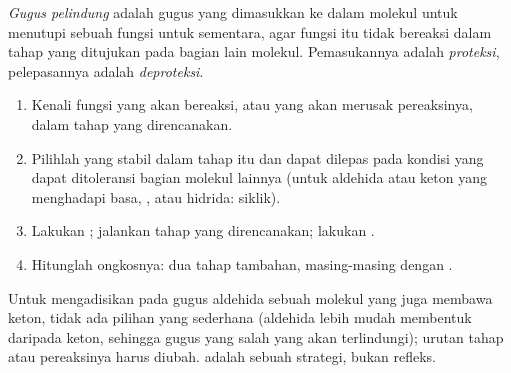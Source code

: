 \begin{definition}\label{def:b1:acetals-protection:protecting-group}
\emph{Gugus pelindung} adalah gugus yang dimasukkan
ke dalam molekul untuk menutupi sebuah fungsi untuk sementara, agar fungsi
itu tidak bereaksi dalam tahap yang ditujukan pada bagian lain molekul.
Pemasukannya adalah \emph{proteksi}, pelepasannya adalah
\emph{deproteksi}.
\end{definition}

\begin{method}\label{met:b1:acetals-protection:protect}
\begin{enumerate}
  \item Kenali fungsi yang akan bereaksi, atau yang akan merusak
        pereaksinya, dalam tahap yang direncanakan.
  \item Pilihlah  yang stabil dalam tahap itu dan dapat
        dilepas pada kondisi yang dapat ditoleransi bagian molekul
        lainnya (untuk aldehida atau keton yang menghadapi basa,
        , atau hidrida:  siklik).
  \item Lakukan ; jalankan tahap yang direncanakan; lakukan
        .
  \item Hitunglah ongkosnya: dua tahap tambahan, masing-masing dengan
        .
\end{enumerate}
\end{method}

\begin{example}\label{ex:b1:acetals-protection:ketoester}
Untuk mengadisikan  pada gugus aldehida sebuah molekul
yang juga membawa keton, tidak ada pilihan  yang sederhana (aldehida
lebih mudah membentuk  daripada keton, sehingga gugus yang salah
yang akan terlindungi); urutan tahap atau pereaksinya harus diubah.
 adalah sebuah strategi, bukan refleks.
\end{example}

